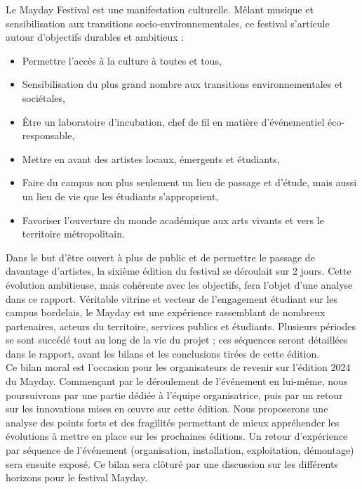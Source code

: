 \documentclass[12pt,a4paper]{report}
\begin{document}
Le Mayday Festival est une manifestation culturelle. Mêlant musique et sensibilisation aux transitions socio-environnementales, ce festival s'articule autour d'objectifs durables et ambitieux :
\begin{itemize}
\item Permettre l’accès à la culture à toutes et tous,
\item Sensibilisation du plus grand nombre aux transitions environnementales et sociétales,
\item Être un laboratoire d’incubation, chef de fil en matière d’événementiel éco-responsable,
\item Mettre en avant des artistes locaux, émergents et étudiants,
\item Faire du campus non plus seulement un lieu de passage et d'étude, mais aussi un lieu de vie que les étudiants s'approprient,
\item Favoriser l’ouverture du monde académique aux arts vivants et vers le territoire métropolitain.\\
\end{itemize}

Dans le but d’être ouvert à plus de public et de permettre le passage de davantage d’artistes, la sixième édition du festival se déroulait sur 2 jours. Cette évolution ambitieuse, mais cohérente avec les objectifs, fera l’objet d’une analyse dans ce rapport. Véritable vitrine et vecteur de l'engagement étudiant sur les campus bordelais, le Mayday est une expérience rassemblant de nombreux partenaires, acteurs du territoire, services publics et étudiants. Plusieurs périodes se sont succédé tout au long de la vie du projet ; ces séquences seront détaillées dans le rapport, avant les bilans et les conclusions tirées de cette édition.\\

Ce bilan moral est l’occasion pour les organisateurs de revenir sur l’édition 2024 du Mayday. Commençant par le déroulement de l'événement en lui-même, nous poursuivrons par une partie dédiée à l'équipe organisatrice, puis par un retour sur les innovations mises en œuvre sur cette édition. Nous proposerons une analyse des points forts et des fragilités permettant de mieux appréhender les évolutions à mettre en place sur les prochaines éditions. Un retour d'expérience par séquence de l'événement (organisation, installation, exploitation, démontage) sera ensuite exposé. Ce bilan sera clôturé par une discussion sur les différents horizons pour le festival Mayday.
\end{document}
